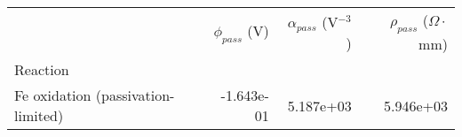 \begin{tabular}{lrrr}
\toprule
{} &  $\phi_{pass}$ (V) &  $\alpha_{pass}$ (V$^{-3}$) &  $\rho_{pass}$ ($\Omega \cdot$mm) \\
Reaction                           &                    &                             &                                   \\
\midrule
Fe oxidation (passivation-limited) &         -1.643e-01 &                   5.187e+03 &                         5.946e+03 \\
\bottomrule
\end{tabular}
